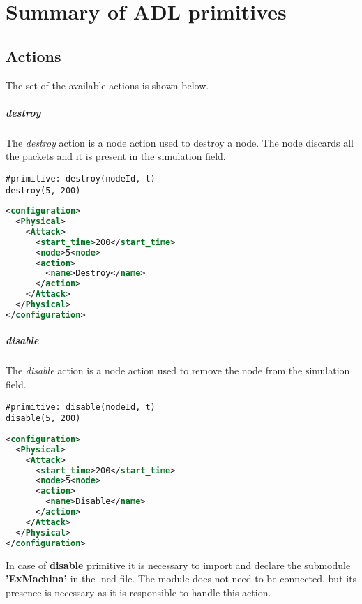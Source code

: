 

\chapter{Summary of ADL primitives}
\label{ch:asl-primitives}

\section{Actions}
The set of the available actions is shown below.

\paragraph{destroy}
The \emph{destroy} action is a node action used to destroy a node. The node discards all the packets and it is present in the simulation field.
%
\begin{lstlisting}[language={asl}, caption={ASL destroy example}]
#primitive: destroy(nodeId, t)
destroy(5, 200)
\end{lstlisting}
%
\begin{lstlisting}[language={xml}, caption={Interpreter output}]
<configuration>
  <Physical>
    <Attack>
      <start_time>200</start_time>
      <node>5<node>
      <action>
        <name>Destroy</name>
      </action>
    </Attack>
  </Physical>
</configuration>
\end{lstlisting}

\paragraph{disable}
The \emph{disable} action is a node action used to remove the node from the simulation field.
%
\begin{lstlisting}[language={asl}, caption={ASL disable example}]
#primitive: disable(nodeId, t)
disable(5, 200)
\end{lstlisting}
%
\begin{lstlisting}[language={xml}, caption={Interpreter output}]
<configuration>
  <Physical>
    <Attack>
      <start_time>200</start_time>
      <node>5<node>
      <action>
        <name>Disable</name>
      </action>
    </Attack>
  </Physical>
</configuration>
\end{lstlisting}

In case of \textbf{disable} primitive it is necessary to import and declare the submodule \textbf{'ExMachina'} in the .ned file. The module does not need to be connected, but its presence is necessary as it is responsible to handle this action.


